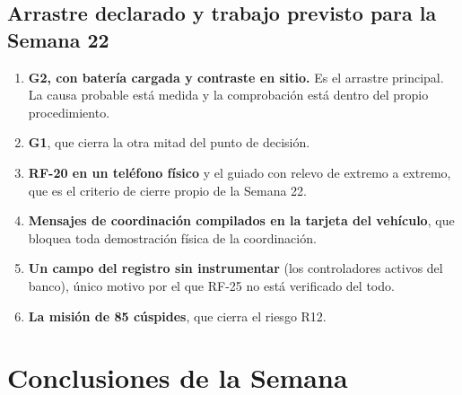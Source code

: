 \documentclass[12pt,letterpaper]{article}
\begin{document}
\subsection{Arrastre declarado y trabajo previsto para la Semana 22}

\begin{enumerate}[leftmargin=*]
    \item \textbf{G2, con batería cargada y contraste en sitio.} Es el arrastre principal. La causa probable está medida y la comprobación está dentro del propio procedimiento.
    \item \textbf{G1}, que cierra la otra mitad del punto de decisión.
    \item \textbf{RF-20 en un teléfono físico} y el guiado con relevo de extremo a extremo, que es el criterio de cierre propio de la Semana 22.
    \item \textbf{Mensajes de coordinación compilados en la tarjeta del vehículo}, que bloquea toda demostración física de la coordinación.
    \item \textbf{Un campo del registro sin instrumentar} (los controladores activos del banco), único motivo por el que RF-25 no está verificado del todo.
    \item \textbf{La misión de 85 cúspides}, que cierra el riesgo R12.
\end{enumerate}

\section{Conclusiones de la Semana}
\end{document}
